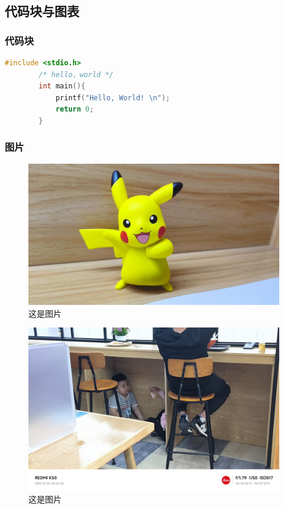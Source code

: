 \begin{ujnbody}
    \subsection{代码块与图表}
    \subsubsection{代码块}
    \begin{lstlisting}[language=C]
        #include <stdio.h>
        /* hello，world */
        int main(){
            printf("Hello, World! \n"); 
            return 0;
        }
    \end{lstlisting}
    \subsubsection{图片}
    \begin{figure}[htbp]
        \centering
        \includegraphics[scale=0.1]{figures/pikachu.jpg}
        \caption{这是图片}
        \label{fig:3}
    \end{figure}
    \begin{figure}[htbp]
        \centering
        \includegraphics[scale=0.1]{figures/children.jpg}
        \caption{这是图片}
        \label{fig:4}
    \end{figure}

\end{ujnbody}

